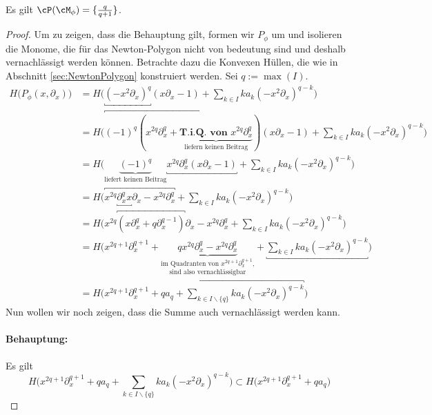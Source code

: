 \begin{lem}
Es gilt $\cP(\cM_{\phi})=\{\frac{q}{q+1}\}$.
\end{lem}
\begin{proof}
\begin{comment}
\cite[5.b.]{sabbah_Fourier-local}
\end{comment}
Um zu zeigen, dass die Behauptung gilt, formen wir $P_{\phi}$ um und isolieren
die Monome, die für das Newton-Polygon nicht von bedeutung sind und deshalb
vernachlässigt werden können. Betrachte dazu die Konvexen Hüllen, die wie in
Abschnitt \ref{sec:NewtonPolygon} konstruiert werden. Sei $q:=\max(I)$.
\begin{align*}
H\Big(P_{\phi}(x,\partial_x)\Big) &= H\Big(\underbracket{(-x^2\partial_x)^{q}}
  (x\partial_x-1) + \sum_{k\in I}k a_k(-x^2\partial_x)^{q-k}\Big)
\\&= H\Big(\overbracket{(-1)^q(x^{2q}\partial_x^q
  + \underset{\text{liefern keinen Beitrag}}{
  \underbrace{\textbf{T.i.Q. von }x^{2q}\partial_x^q}})}
  (x\partial_x - 1) + \sum_{k\in I}k a_k(-x^2\partial_x)^{q-k} \Big)
\\&= H\Big(\underset{\text{liefert keinen Beitrag}}{\underbrace{(-1)^q}}
  \underbracket{x^{2q}\partial_x^q (x\partial_x - 1)}
  + \sum_{k\in I}k a_k(-x^2\partial_x)^{q-k} \Big)
\\&= H\Big(\overbracket{x^{2q}\underbracket{\partial_x^q x}\partial_x
  - x^{2q}\partial_x^q} + \sum_{k\in I}k a_k(-x^2\partial_x)^{q-k} \Big)
\\&= H\Big(x^{2q}\overbracket{(x\partial_x^q + q\partial_x^{q-1})}\partial_x
  - x^{2q}\partial_x^q + \sum_{k\in I}k a_k(-x^2\partial_x)^{q-k} \Big)
\\&= H\Big(x^{2q + 1}\partial_x^{q + 1}
  + \underset{\text{sind also vernachlässigbar}}{
  \underset{\text{im Quadranten von $x^{2q + 1}\partial_x^{q + 1}$,}}{
  \underbrace{qx^{2q}\partial_x^{q} - x^{2q}\partial_x^q}}}
  +\underbracket{ \sum_{k\in I}k a_k(-x^2\partial_x)^{q-k}} \Big)
\\&= H\Big(x^{2q + 1}\partial_x^{q + 1} +\overbracket{ qa_q
  + \sum_{k\in I\backslash\{q\}}k a_k(-x^2\partial_x)^{q-k}} \Big)
\end{align*}
Nun wollen wir noch zeigen, dass die Summe auch vernachlässigt werden kann.
\paragraph{Behauptung:} Es gilt
\[
H\Big(x^{2q + 1}\partial_x^{q + 1} + qa_q
  + \sum_{k\in I\backslash\{q\}}k a_k(-x^2\partial_x)^{q-k} \Big)
\subset H\Big(x^{2q + 1}\partial_x^{q + 1} + qa_q \Big)
\]

\end{proof}
